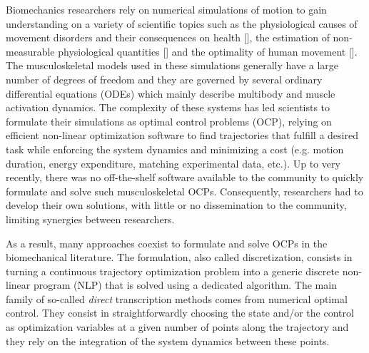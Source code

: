 Biomechanics researchers rely on numerical simulations of motion to gain understanding on a variety of scientific topics such as the physiological causes of movement disorders and their consequences on health [\addref], the estimation of non-measurable physiological quantities [\addref] and the optimality of human movement [\addref].
The musculoskeletal models used in these simulations generally have a large number of degrees of freedom and they are governed by several ordinary differential equations (ODEs) which mainly describe multibody and muscle activation dynamics.
The complexity of these systems has led scientists to formulate their simulations as optimal control problems (OCP), relying on efficient non-linear optimization software to find trajectories that fulfill a desired task while enforcing the system dynamics and minimizing a cost (e.g. motion duration, energy expenditure, matching experimental data, etc.).
Up to very recently, there was no off-the-shelf software available to the community to quickly formulate and solve such musculoskeletal OCPs. 
Consequently, researchers had to develop their own solutions, with little or no dissemination to the community, limiting  synergies between researchers.


As a result, many approaches coexist to formulate and solve OCPs in the biomechanical literature. 
The formulation, also called discretization, consists in turning a continuous trajectory optimization problem into a generic discrete non-linear program (NLP) that is solved using a dedicated algorithm. 
The main family of so-called \textit{direct} transcription methods comes from numerical optimal control. 
They consist in straightforwardly choosing the state and/or the control as optimization variables at a given number of points along the trajectory and they rely on the integration of the system dynamics between these points. 

